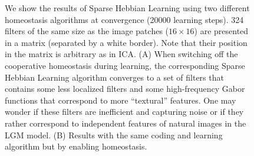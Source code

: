 {\begin{figure}
{We show the results of Sparse Hebbian Learning using two different homeostasis algorithms at convergence (20000 learning steps). 324 filters of the same size as the image patches ($16 \times 16$) are presented in a matrix (separated by a white border). Note that their position in the matrix is arbitrary as in ICA. {\sf (A)} When switching off the cooperative homeostasis during learning, the corresponding Sparse Hebbian Learning algorithm converges to a set of filters that contains some less localized filters and some high-frequency Gabor functions that correspond to more ``textural'' features. One may wonder if these filters are inefficient and capturing noise or if they rather correspond to independent features of natural images in the LGM model. {\sf (B)} Results with the same coding and learning algorithm but by enabling homeostasis. %
\label{fig:map}}%
\end{figure}%
}%
